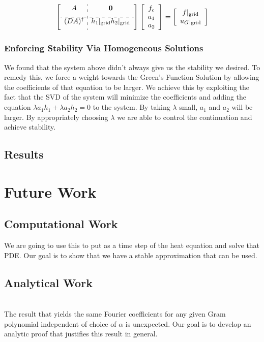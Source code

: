 \documentclass[11pt]{amsart}
\begin{document}
\begin{equation}
\left[
\begin{array}{c:c}
A &  \mathbf{0} \\[6pt] \hdashline
(DA)^{\dagger} & h_1|_{\text{grid}} h_2|_{\text{grid}} \\[6pt]
\end{array} \right] 
\left[ 
\begin{array}{c}
f_c \\
a_1\\
a_2
\end{array}
\right]
= 
\left[ 
\begin{array}{c}
f|_{\text{grid}}\\
u_G|_{\text{grid}}
\end{array}
\right]
\end{equation}





\subsubsection{Enforcing Stability Via Homogeneous Solutions}
We found that the system above didn't always give us the stability we desired. To remedy this, we force a weight towards the Green's Function Solution by allowing the coefficients of that equation to be larger.  We achieve this by exploiting the fact that the SVD of the system will minimize the coefficients and adding the equation $\lambda a_1 h_1 + \lambda a_2 h_2 = 0$ to the system.  By taking $\lambda$ small, $a_1$ and $a_2$ will be larger.  By appropriately choosing $\lambda$ we are able to control the continuation and achieve stability. 

\subsection{Results} 
\section{Future Work} 
\subsection{Computational Work} 
We are going to use this to put as a time step of the heat equation and solve that PDE.  Our goal is to show that we have a stable approximation that can be used. 
\subsection{Analytical Work} \\
The result that yields the same Fourier coefficients for any given Gram polynomial independent of choice of $\alpha$ is unexpected.  Our goal is to develop an analytic proof that justifies this result in general. 
\end{document}
